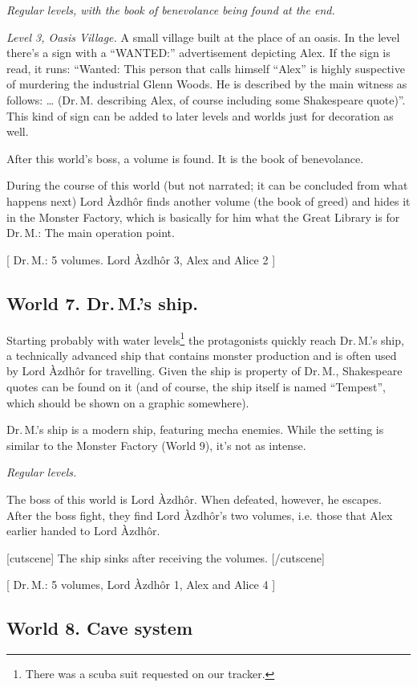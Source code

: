 \documentclass{gd-document}
\newcommand\DrM{Dr.\,M.\xspace}
\newcommand\Azdhor{Lord Àzdhôr\xspace}
\newcommand\level[1]{\textit{#1}}
\begin{document}
\level{Regular levels, with the book of benevolance being found at the end.}

\level{Level 3, Oasis Village.} A small village built at the place of
an oasis. In the level there’s a sign with a “WANTED:” advertisement depicting
Alex. If the sign is read, it runs: “Wanted: This person
that calls himself “Alex” is highly suspective of murdering the
industrial Glenn Woods. He is described by the main witness as
follows: … (\DrM describing Alex, of course including some Shakespeare
quote)”. This kind of sign can be added to later levels and worlds just for
decoration as well.

After this world’s boss, a volume is found. It is the book of
benevolance.

During the course of this world (but not narrated; it can be concluded
from what happens next) \Azdhor finds another volume (the book of
greed) and hides it in the Monster Factory, which is basically for him what the Great Library
is for \DrM: The main operation point.

[ \DrM: 5 volumes. \Azdhor 3, Alex and Alice 2 ]

\subsection{World 7. \DrM{}’s ship.}

Starting probably with water levels\footnote{There was a scuba suit
  requested on our tracker.} the protagonists quickly reach \DrM{}’s
ship, a technically advanced ship that contains monster production and
is often used by \Azdhor for travelling. Given the ship is property of
\DrM, Shakespeare quotes can be found on it (and of course, the ship
itself is named “Tempest”, which should be shown on a graphic somewhere).

\DrM{}’s ship is a modern ship, featuring mecha enemies. While the
setting is similar to the Monster Factory (World 9), it’s not as
intense.

\level{Regular levels.}

The boss of this world is \Azdhor. When defeated, however, he
escapes. After the boss fight, they find \Azdhor{}’s two volumes,
i.e. those that Alex earlier handed to \Azdhor.

[cutscene]
The ship sinks after receiving the volumes.
[/cutscene]

[ \DrM: 5 volumes, \Azdhor 1, Alex and Alice 4 ]

\subsection{World 8. Cave system}
\end{document}
